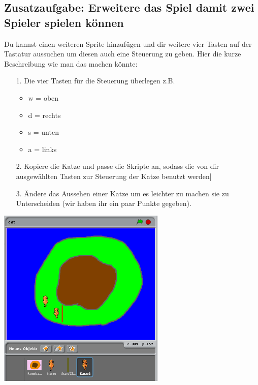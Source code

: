 \subsection{Zusatzaufgabe: Erweitere das Spiel damit zwei Spieler spielen können}
Du kannst einen weiteren Sprite hinzufügen und dir weitere vier Tasten auf der Tastatur aussuchen um diesen auch eine Steuerung zu geben. Hier die kurze Beschreibung wie man das machen könnte:
\begin{itemize}
\item[1. ] Die vier Tasten für die Steuerung überlegen z.B.
  \begin{itemize}
  \item w = oben
  \item d = rechts
  \item s = unten
  \item a = links
\end{itemize}
\item[2. ] Kopiere die Katze und passe die Skripte an, sodass die von dir ausgewählten Tasten zur Steuerung der Katze benutzt werden]
  \item[3. ] Ändere das Aussehen einer Katze um es leichter zu machen sie zu Unterscheiden (wir haben ihr ein paar Punkte gegeben).
\end{itemize}
\includegraphics[width=0.6\textwidth]{images/aufgabe4_multiplayer.png}
